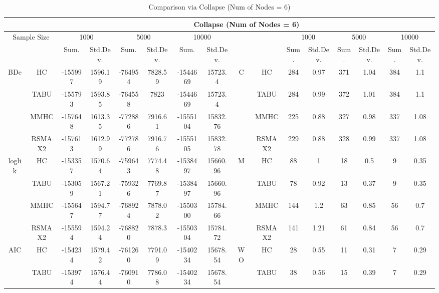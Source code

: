 \begin{table}[p]																										
\centering	\caption{Comparison  via Collapse (Num of Nodes = 6)}	\tiny																						
{\tabcolsep=0.01in																										
\begin{tabular}{cc||cc|cc|cc||cc|cc|cc|cc}																										
\hline																										
&	&	\multicolumn{14}{c}{Collapse	(Num	of	Nodes	=	6)}\tabularnewline																			
\hline																										
\multicolumn{2}{c||}{Sample	Size}	&	\multicolumn{2}{c|}{1000}	&	\multicolumn{2}{c|}{5000}	&	\multicolumn{2}{c||}{10000}	&	&	&	\multicolumn{2}{c|}{1000}	&	\multicolumn{2}{c|}{5000}	&	\multicolumn{2}{c}{10000}\tabularnewline											
\hline																										
&	&	Sum.	&	Std.Dev.	&	Sum.	&	Std.Dev.	&	Sum.	&	Std.Dev.	&	&	&	Sum.	&	Std.Dev.	&	Sum.	&	Std.Dev.	&	Sum.	&	Std.Dev.\tabularnewline
\hline																										
\hline																										
\multirow{4}{*}{BDe} & HC &	-155997 & 	1596.19 & 	-764954 & 	7828.59 & 	-1544669 & 	15723.4 & 	\multirow{4}{*}{C} & HC &	284 & 	0.97 & 	371 & 	1.04 & 	384 & 	1.1\tabularnewline													
& TABU &	-155793 & 	1593.85 & 	-764558 & 	7823 & 	-1544669 & 	15723.4 & 	& TABU &	284 & 	0.99 & 	372 & 	1.01 & 	384 & 	1.1\tabularnewline													
& MMHC &	-157648 & 	1613.35 & 	-772886 & 	7916.61 & 	-1555104 & 	15832.76 & 	& MMHC &	225 & 	0.88 & 	327 & 	0.98 & 	337 & 	1.08\tabularnewline													
& RSMAX2 &	-157613 & 	1612.99 & 	-772786 & 	7916.76 & 	-1555105 & 	15832.78 & 	& RSMAX2 &	229 & 	0.88 & 	328 & 	0.99 & 	337 & 	1.08\tabularnewline													
\hline																										
\multirow{4}{*}{loglik} & HC &	-153357 & 	1570.64 & 	-759643 & 	7774.48 & 	-1538497 & 	15660.96 & 	\multirow{4}{*}{M} & HC &	88 & 	1 & 	18 & 	0.5 & 	9 & 	0.35\tabularnewline													
& TABU &	-153059 & 	1567.21 & 	-759326 & 	7769.87 & 	-1538497 & 	15660.96 & 	& TABU &	78 & 	0.92 & 	13 & 	0.37 & 	9 & 	0.35\tabularnewline													
& MMHC &	-155647 & 	1594.77 & 	-768924 & 	7878.02 & 	-1550300 & 	15784.66 & 	& MMHC &	144 & 	1.2 & 	63 & 	0.85 & 	56 & 	0.7\tabularnewline													
& RSMAX2 &	-155594 & 	1594.24 & 	-768820 & 	7878.3 & 	-1550304 & 	15784.72 & 	& RSMAX2 &	141 & 	1.21 & 	61 & 	0.84 & 	56 & 	0.7\tabularnewline													
\hline																										
\multirow{4}{*}{AIC} & HC &	-154234 & 	1579.42 & 	-761260 & 	7791.09 & 	-1540234 & 	15678.54 & 	\multirow{4}{*}{WO} & HC &	28 & 	0.55 & 	11 & 	0.31 & 	7 & 	0.29\tabularnewline													
& TABU &	-153974 & 	1576.44 & 	-760910 & 	7786.08 & 	-1540234 & 	15678.54 & 	& TABU &	38 & 	0.56 & 	15 & 	0.39 & 	7 & 	0.29\tabularnewline													

\end{tabular}}
\end{table}
